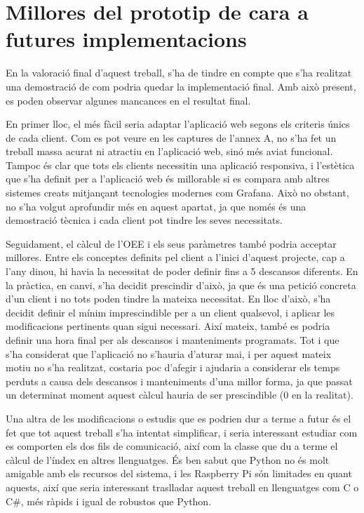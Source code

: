 \documentclass{tfgitic}[2022/06/30]
\begin{document}
\chapter{Millores del prototip de cara a futures implementacions}
En la valoració final d'aquest treball, s'ha de tindre en compte que s'ha realitzat una demostració de com podria quedar la implementació final. Amb això present, es poden observar algunes mancances en el resultat final.

En primer lloc, el més fàcil seria adaptar l'aplicació web segons els criteris únics de cada client. Com es pot veure en les captures de l'annex A, no s'ha fet un treball massa acurat ni atractiu en l'aplicació web, sinó més aviat funcional. Tampoc és clar que tots els clients necessitin una aplicació responsiva, i l'estètica que s'ha definit per a l'aplicació web és millorable si es compara amb altres sistemes creats mitjançant tecnologies modernes com Grafana. Això no obstant, no s'ha volgut aprofundir més en aquest apartat, ja que només és una demostració tècnica i cada client pot tindre les seves necessitats.

Seguidament, el càlcul de l'OEE i els seus paràmetres també podria acceptar millores. Entre els conceptes definits pel client a l'inici d'aquest projecte, cap a l'any dinou, hi havia la necessitat de poder definir fins a 5 descansos diferents. En la pràctica, en canvi, s'ha decidit prescindir d'això, ja que és una petició concreta d'un client i no tots poden tindre la mateixa necessitat. En lloc d'això, s'ha decidit definir el mínim imprescindible per a un client qualsevol, i aplicar les modificacions pertinents quan sigui necessari. Així mateix, també es podria definir una hora final per als descansos i manteniments programats. Tot i que s'ha considerat que l'aplicació no s'hauria d'aturar mai, i per aquest mateix motiu no s'ha realitzat, costaria poc d'afegir i ajudaria a considerar els temps perduts a causa dels descansos i manteniments d'una millor forma, ja que passat un determinat moment aquest càlcul hauria de ser prescindible (0 en la realitat).

Una altra de les modificacions o estudis que es podrien dur a terme a futur és el fet que tot aquest treball s'ha intentat simplificar, i seria interessant estudiar com es comporten els dos fils de comunicació, així com la classe que du a terme el càlcul de l'índex  en altres llenguatges. És ben sabut que Python no és molt amigable amb els recursos del sistema, i les Raspberry Pi són limitades en quant aquests, així que seria interessant traslladar aquest treball en llenguatges com C o C\#, més ràpids i igual de robustos que Python.
\end{document}
